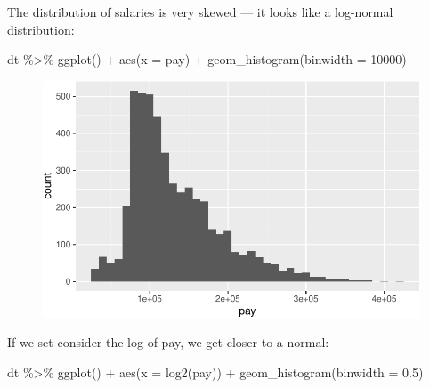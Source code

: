 \documentclass[
  letterpaper,
  DIV=11,
  numbers=noendperiod]{scrreprt}
\newenvironment{Shaded}{\begin{snugshade}}{\end{snugshade}}
\newcommand{\AttributeTok}[1]{\textcolor[rgb]{0.40,0.45,0.13}{#1}}
\newcommand{\DecValTok}[1]{\textcolor[rgb]{0.68,0.00,0.00}{#1}}
\newcommand{\FloatTok}[1]{\textcolor[rgb]{0.68,0.00,0.00}{#1}}
\newcommand{\FunctionTok}[1]{\textcolor[rgb]{0.28,0.35,0.67}{#1}}
\newcommand{\NormalTok}[1]{\textcolor[rgb]{0.00,0.23,0.31}{#1}}
\newcommand{\SpecialCharTok}[1]{\textcolor[rgb]{0.37,0.37,0.37}{#1}}
\begin{document}
The distribution of salaries is very skewed --- it looks like a
log-normal distribution:

\begin{Shaded}
\begin{Highlighting}[]
\NormalTok{dt }\SpecialCharTok{\%\textgreater{}\%} \FunctionTok{ggplot}\NormalTok{() }\SpecialCharTok{+} \FunctionTok{aes}\NormalTok{(}\AttributeTok{x =}\NormalTok{ pay) }\SpecialCharTok{+} \FunctionTok{geom\_histogram}\NormalTok{(}\AttributeTok{binwidth =} \DecValTok{10000}\NormalTok{)}
\end{Highlighting}
\end{Shaded}

\begin{figure}[H]

{\centering \includegraphics{./08-linearreg_files/figure-pdf/unnamed-chunk-32-1.pdf}

}

\end{figure}

If we set consider the log of pay, we get closer to a normal:

\begin{Shaded}
\begin{Highlighting}[]
\NormalTok{dt }\SpecialCharTok{\%\textgreater{}\%} \FunctionTok{ggplot}\NormalTok{() }\SpecialCharTok{+} \FunctionTok{aes}\NormalTok{(}\AttributeTok{x =} \FunctionTok{log2}\NormalTok{(pay)) }\SpecialCharTok{+} \FunctionTok{geom\_histogram}\NormalTok{(}\AttributeTok{binwidth =} \FloatTok{0.5}\NormalTok{)}
\end{Highlighting}
\end{Shaded}
\end{document}
